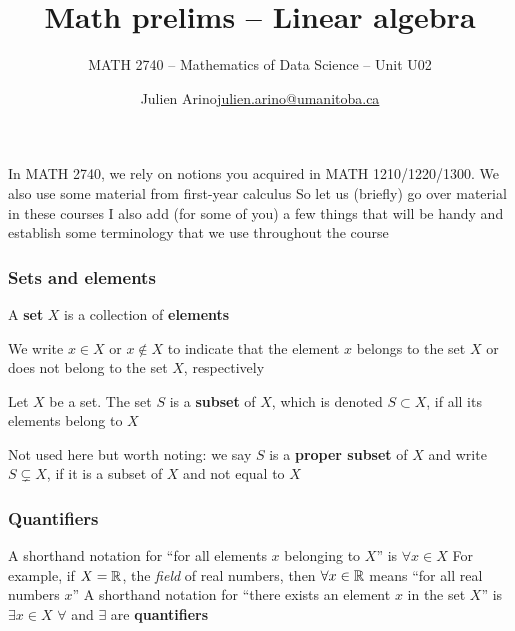 \documentclass[aspectratio=169]{beamer}\usepackage[]{graphicx}\usepackage[]{xcolor}
\subtitle{MATH 2740 -- Mathematics of Data Science -- Unit U02}
\author{\texorpdfstring{Julien Arino\newline\url{julien.arino@umanitoba.ca}}{Julien Arino}}
\institute{Department of Mathematics @ University of Manitoba}
\title{Math prelims -- Linear algebra}
\begin{document}


\SStitlepage

\begin{frame}
In MATH 2740, we rely on notions you acquired in MATH 1210/1220/1300. We also use some material from first-year calculus
\vfill
So let us (briefly) go over material in these courses
\vfill
I also add (for some of you) a few things that will be handy and establish some terminology that we use throughout the course
\end{frame}


\SSoutlinepage


\begin{frame}
\frametitle{Sets and elements}
	\begin{definition}[Set]
		A \textbf{set} $X$ is a collection of \textbf{elements}
	\end{definition}
	We write $x\in X$ or $x\not\in X$ to indicate that the element $x$ belongs to
	the set $X$ or does not belong to the set $X$, respectively
	\vfill
	\begin{definition}[Subset]
		Let $X$ be a set. The set $S$ is a \textbf{subset} of $X$, which is denoted
		$S\subset X$, if all its elements belong to $X$
	\end{definition}
Not used here but worth noting: we say $S$ is a \textbf{proper subset} of $X$ and write $S\subsetneq X$, if it is a subset of $X$ and not equal to $X$
\end{frame}


\begin{frame}
\frametitle{Quantifiers}
	A shorthand notation for ``for all elements $x$ belonging to $X$'' is $\forall x\in X$
	\vfill
	For example, if $X=\mathbb{R}$, the \emph{field} of real numbers, then $\forall x\in\mathbb{R}$ means ``for all real numbers $x$''
	\vfill
	A shorthand notation for ``there exists an element $x$ in the set $X$'' is
	$\exists x\in X$
	\vfill
	$\forall$ and $\exists$ are \textbf{quantifiers}
\end{frame}
\end{document}
